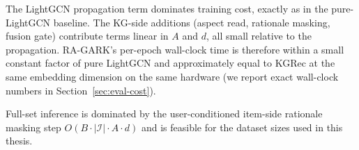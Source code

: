The LightGCN propagation term dominates training cost, exactly as in the pure-LightGCN baseline. The KG-side additions (aspect read, rationale masking, fusion gate) contribute terms linear in $A$ and $d$, all small relative to the propagation. RA-GARK's per-epoch wall-clock time is therefore within a small constant factor of pure LightGCN and approximately equal to KGRec at the same embedding dimension on the same hardware (we report exact wall-clock numbers in Section~\ref{sec:eval-cost}).

Full-set inference is dominated by the user-conditioned item-side rationale masking step $O(B \cdot |\mathcal{I}| \cdot A \cdot d)$ and is feasible for the dataset sizes used in this thesis.
